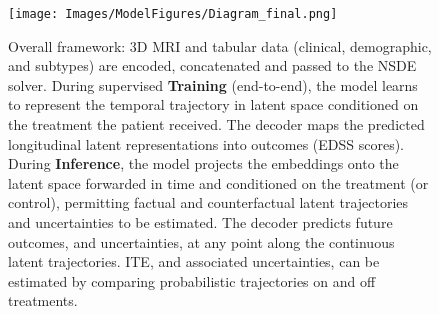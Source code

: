 \documentclass[runningheads]{llncs}
\begin{document}
\begin{figure}[h]
\label{fig:framework}
\centering
\texttt{[image: Images/ModelFigures/Diagram\_final.png]}
\caption{Overall framework: 3D MRI and tabular data (clinical, demographic, and subtypes) are encoded, concatenated and passed to the NSDE solver. During supervised \textbf{Training} (end-to-end), the model learns to represent the temporal trajectory in latent space conditioned on the treatment the patient received. The decoder maps the predicted longitudinal latent representations into outcomes (EDSS scores). During \textbf{Inference}, the model projects the embeddings onto the latent space forwarded in time and conditioned on the treatment (or control), permitting factual and counterfactual latent trajectories and uncertainties to be estimated. The decoder predicts future outcomes, and uncertainties, at any point along the continuous latent trajectories. ITE, and associated uncertainties, can be estimated by comparing probabilistic trajectories on and off treatments.}
\label{fig:diagram}
\end{figure}
\end{document}
